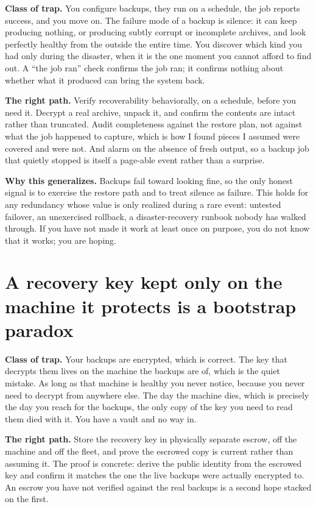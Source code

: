 \documentclass[12pt]{article}
\begin{document}
\textbf{Class of trap.} You configure backups, they run on a schedule, the job reports success, and you move on. The failure mode of a backup is silence: it can keep producing nothing, or producing subtly corrupt or incomplete archives, and look perfectly healthy from the outside the entire time. You discover which kind you had only during the disaster, when it is the one moment you cannot afford to find out. A ``the job ran'' check confirms the job ran; it confirms nothing about whether what it produced can bring the system back.

\textbf{The right path.} Verify recoverability behaviorally, on a schedule, before you need it. Decrypt a real archive, unpack it, and confirm the contents are intact rather than truncated. Audit completeness against the restore plan, not against what the job happened to capture, which is how I found pieces I assumed were covered and were not. And alarm on the absence of fresh output, so a backup job that quietly stopped is itself a page-able event rather than a surprise.

\textbf{Why this generalizes.} Backups fail toward looking fine, so the only honest signal is to exercise the restore path and to treat silence as failure. This holds for any redundancy whose value is only realized during a rare event: untested failover, an unexercised rollback, a disaster-recovery runbook nobody has walked through. If you have not made it work at least once on purpose, you do not know that it works; you are hoping.

\section{A recovery key kept only on the machine it protects is a bootstrap paradox}

\textbf{Class of trap.} Your backups are encrypted, which is correct. The key that decrypts them lives on the machine the backups are of, which is the quiet mistake. As long as that machine is healthy you never notice, because you never need to decrypt from anywhere else. The day the machine dies, which is precisely the day you reach for the backups, the only copy of the key you need to read them died with it. You have a vault and no way in.

\textbf{The right path.} Store the recovery key in physically separate escrow, off the machine and off the fleet, and prove the escrowed copy is current rather than assuming it. The proof is concrete: derive the public identity from the escrowed key and confirm it matches the one the live backups were actually encrypted to. An escrow you have not verified against the real backups is a second hope stacked on the first.
\end{document}
